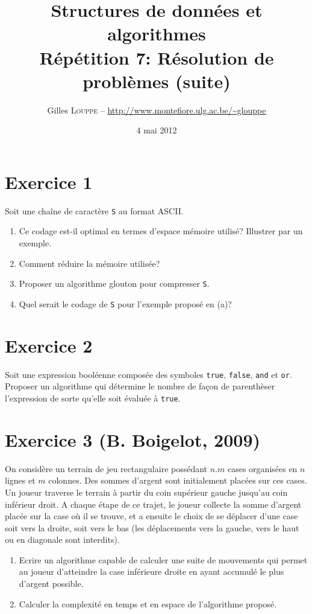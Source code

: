 \documentclass[a4paper,10pt]{article}
\title{
    \textbf{Structures de données et algorithmes}\\
    Répétition 7: Résolution de problèmes (suite)
}
\author{Gilles \textsc{Louppe} -- \url{http://www.montefiore.ulg.ac.be/~glouppe}}
\date{4 mai 2012}
\begin{document}
\maketitle

\section*{Exercice 1}

Soit une chaîne de caractère \texttt{S} au format ASCII.

\begin{enumerate}
\item Ce codage est-il optimal en termes d'espace mémoire utilisé? Illustrer par un exemple.
\item Comment réduire la mémoire utilisée?
\item Proposer un algorithme glouton pour compresser \texttt{S}.
\item Quel serait le codage de \texttt{S} pour l'exemple proposé en (a)?
\end{enumerate}

\section*{Exercice 2}


Soit une expression booléenne composée des symboles \texttt{true}, \texttt{false}, \texttt{and} et \texttt{or}. Proposer un algorithme qui détermine le nombre de façon de parenthèser l'expression de sorte qu'elle soit évaluée à \texttt{true}.

\section*{Exercice 3 (B. Boigelot, 2009)}

On considère un terrain de jeu rectangulaire possédant $n.m$ cases organisées en
$n$ lignes et $m$ colonnes. Des sommes d'argent sont initialement placées sur
ces cases. Un joueur traverse le terrain à partir du coin supérieur gauche
jusqu'au coin inférieur droit. A chaque étape de ce trajet, le joueur collecte
la somme d'argent placée sur la case où il se trouve, et a ensuite le choix de
se déplacer d'une case soit vers la droite, soit vers le bas (les déplacements
vers la gauche, vers le haut ou en diagonale sont interdits).

\begin{enumerate}
\item Ecrire un algorithme capable de calculer une suite de mouvements qui permet au joueur d'atteindre la case inférieure droite en ayant accumulé le plus d'argent possible.
\item Calculer la complexité en temps et en espace de l'algorithme proposé.
\end{enumerate}
\end{document}
